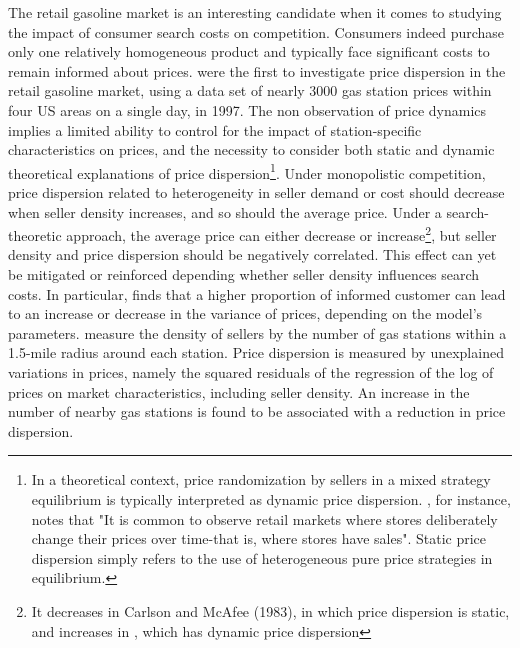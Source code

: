\documentclass[english]{article}
\begin{document}
The retail gasoline market is an interesting candidate when it comes to studying the impact of consumer search costs on competition. Consumers indeed purchase only one relatively homogeneous product and typically face significant costs to remain informed about prices. \cite{BAR04} were the first to investigate price dispersion in the retail gasoline market, using a data set of nearly 3000 gas station prices within four US areas on a single day, in 1997. The non observation of price dynamics implies a limited ability to control for the impact of station-specific characteristics on prices, and the necessity to consider both static and dynamic theoretical explanations of price dispersion\footnote{In a theoretical context, price randomization by sellers in a mixed strategy equilibrium is typically interpreted as dynamic price dispersion. \cite{VAR80}, for instance, notes that "It is common to observe retail markets where stores deliberately change their prices over time-that is, where stores have sales". Static price dispersion simply refers to the use of heterogeneous pure price strategies in equilibrium.}. Under monopolistic competition, price dispersion related to heterogeneity in seller demand or cost should decrease when seller density increases, and so should the average price. Under a search-theoretic approach, the average price can either decrease or increase\footnote{It decreases in Carlson and McAfee (1983), in which price dispersion is static, and increases in \cite{VAR80}, which has dynamic price dispersion}, but  seller density and price dispersion should be negatively correlated. This effect can yet be mitigated or reinforced depending whether seller density influences search costs. In particular, \cite{VAR80} finds that a higher proportion of informed customer can lead to an increase or decrease in the variance of prices, depending on the model's parameters. \cite{BAR04} measure the density of sellers by the number of gas stations within a 1.5-mile radius around each station. Price dispersion is measured by unexplained variations in prices, namely the squared residuals of the regression of the log of prices on market characteristics, including seller density. An increase in the number of nearby gas stations is found to be associated with a reduction in price dispersion.
\end{document}
